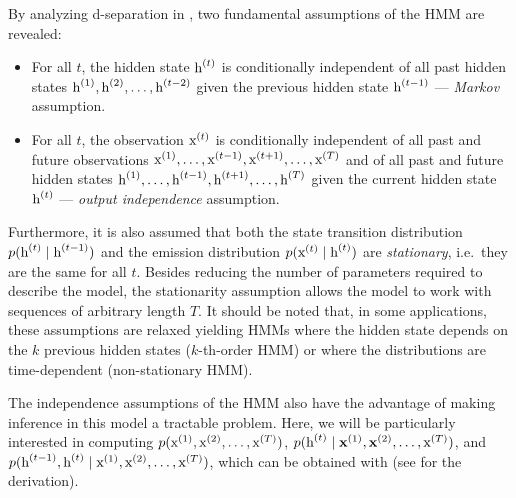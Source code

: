 By analyzing d-separation in , two fundamental assumptions of the HMM are revealed:
\begin{itemize}
    \item For all $t$, the hidden state ${\textnormal{h}}^{(t)}$ is conditionally independent of all past hidden states ${\textnormal{h}}^{(1)},{\textnormal{h}}^{(2)},\dots,{\textnormal{h}}^{(t-2)}$ given the previous hidden state ${\textnormal{h}}^{(t-1)}$ --- \emph{Markov} assumption.
    \item For all $t$, the observation ${\textnormal{x}}^{(t)}$ is conditionally independent of all past and future observations ${\textnormal{x}}^{(1)},\dots,{\textnormal{x}}^{(t-1)},{\textnormal{x}}^{(t+1)},\dots,{\textnormal{x}}^{(T)}$ and of all past and future hidden states ${\textnormal{h}}^{(1)},\dots,{\textnormal{h}}^{(t-1)},{\textnormal{h}}^{(t+1)},\dots,{\textnormal{h}}^{(T)}$ given the current hidden state ${\textnormal{h}}^{(t)}$ --- \emph{output independence} assumption.
\end{itemize}
Furthermore, it is also assumed that both the state transition distribution $p({\textnormal{h}}^{(t)} \mid {\textnormal{h}}^{(t-1)})$ and the emission distribution $p({\textnormal{x}}^{(t)} \mid {\textnormal{h}}^{(t)})$ are \emph{stationary}, i.e.\ they are the same for all $t$. Besides reducing the number of parameters required to describe the model, the stationarity assumption allows the model to work with sequences of arbitrary length $T$. It should be noted that, in some applications, these assumptions are relaxed yielding HMMs where the hidden state depends on the $k$ previous hidden states ($k$-th-order HMM) or where the distributions are time-dependent (non-stationary HMM).

The independence assumptions of the HMM also have the advantage of making inference in this model a tractable problem. Here, we will be particularly interested in computing $p({\textnormal{x}}^{(1)}, {\textnormal{x}}^{(2)}, \dots, {\textnormal{x}}^{(T)})$, $p({\textnormal{h}}^{(t)} \mid {\mathbf{x}}^{(1)}, {\mathbf{x}}^{(2)}, \dots, {\textnormal{x}}^{(T)})$, and $p({\textnormal{h}}^{(t-1)}, {\textnormal{h}}^{(t)}  \mid {\textnormal{x}}^{(1)}, {\textnormal{x}}^{(2)}, \dots, {\textnormal{x}}^{(T)})$, which can be obtained with  (see \citet{Bishop2006} for the derivation).

